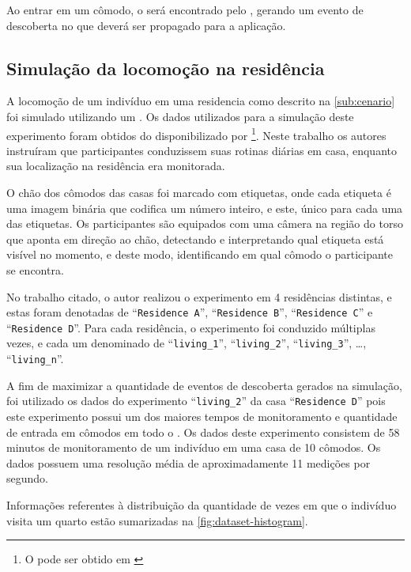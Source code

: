 Ao entrar em um cômodo, o \beacon será encontrado pelo \mhubcddl, gerando um evento de descoberta no \stwopa que deverá ser propagado para a aplicação.

\subsection{Simulação da locomoção na residência}\label{subsec:simulacao-loc}

A locomoção de um indivíduo em uma residencia como descrito na \autoref{sub:cenario} foi simulado utilizando um \dataset.
Os dados utilizados para a simulação deste experimento foram obtidos do \dataset disponibilizado por \footnote{O \dataset pode ser obtido em \cite{byrne:kozlowski:dataset:2019}}.
Neste trabalho os autores instruíram que participantes conduzissem suas rotinas diárias em casa, enquanto sua localização na residência era monitorada.

O chão dos cômodos das casas foi marcado com etiquetas, onde cada etiqueta é uma imagem binária que codifica um número inteiro, e este, único para cada uma das etiquetas. Os participantes são equipados com uma câmera na região do torso que aponta em direção ao chão, detectando e interpretando qual etiqueta está visível no momento, e deste modo, identificando em qual cômodo o participante se encontra.

No trabalho citado, o autor realizou o experimento em 4 residências distintas, e estas foram denotadas de ``\texttt{Residence A}'', ``\texttt{Residence B}'', ``\texttt{Residence C}'' e ``\texttt{Residence D}''. Para cada residência, o experimento foi conduzido múltiplas vezes, e cada um denominado de ``\texttt{living\_1}'', ``\texttt{living\_2}'', ``\texttt{living\_3}'', \dots{}, ``\texttt{living\_n}''.


A fim de maximizar a quantidade de eventos de descoberta gerados na simulação, foi utilizado os dados do experimento ``\texttt{living\_2}'' da casa ``\texttt{Residence D}'' pois este experimento possui um dos maiores tempos de monitoramento e quantidade de entrada em cômodos em todo o \dataset. Os dados deste experimento consistem de 58 minutos de monitoramento de um indivíduo em uma casa de 10 cômodos. Os dados possuem uma resolução média de aproximadamente 11 medições por segundo.

Informações referentes à distribuição da quantidade de vezes em que o indivíduo visita um quarto estão sumarizadas na \autoref{fig:dataset-histogram}.

